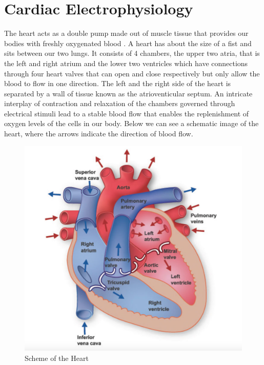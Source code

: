 \documentclass[../draft_1.tex]{subfiles}
\begin{document}
\chapter{Cardiac Electrophysiology}

The heart acts as a double pump made out of muscle tissue that provides our bodies with freshly oxygenated blood \cite{deMotuCordis}. A heart has about the size of a fist and sits between our two lungs. It consists of 4 chambers, the upper two atria, that is the left and right atrium and the lower two ventricles which have connections through four heart valves that can open and close respectively but only allow the blood to flow in one direction. The left and the right side of the heart is separated by a wall of tissue known as the atrioventicular septum. An intricate interplay of contraction and relaxation of the chambers governed through electrical stimuli lead to a stable blood flow that enables the replenishment of oxygen levels of the cells in our body. Below we can see a schematic image of the heart, where the arrows indicate the direction of blood flow.

\begin{figure}[ht!]
	\centering
	\includegraphics[scale=0.3]{images/heart_structure_2}
	\caption{Scheme of the Heart \cite{franzone2014mathematical}}
\end{figure}
\end{document}
